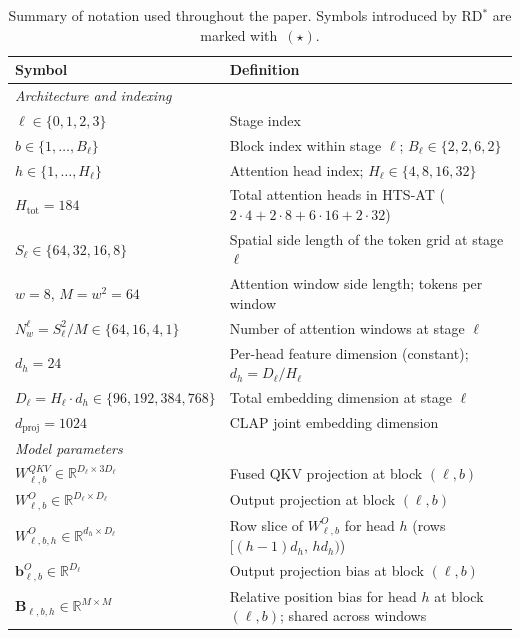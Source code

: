 \begin{table}[h]
\centering
\small
\setlength{\tabcolsep}{4pt}
\renewcommand{\arraystretch}{0.92}
\caption{Summary of notation used throughout the paper. 
    Symbols introduced by RD$^*$ are marked with~$(\star)$.}
\label{tab:notation}
\begin{tabularx}{\textwidth}{lX}
\toprule
\textbf{Symbol} & \textbf{Definition} \\
\midrule
\multicolumn{2}{l}{\textit{Architecture and indexing}} \\
\midrule
$\ell \in \{0,1,2,3\}$ & Stage index \\
$b \in \{1,\ldots,B_\ell\}$ & Block index within stage $\ell$; $B_\ell \in \{2,2,6,2\}$ \\
$h \in \{1,\ldots,H_\ell\}$ & Attention head index; $H_\ell \in \{4,8,16,32\}$ \\
$H_{\mathrm{tot}} = 184$ & Total attention heads in HTS-AT ($2\cdot4+2\cdot8+6\cdot16+2\cdot32$) \\
$S_\ell \in \{64,32,16,8\}$ & Spatial side length of the token grid at stage $\ell$ \\
$w = 8$, $M = w^2 = 64$ & Attention window side length; tokens per window \\
$N_w^\ell = S_\ell^2/M \in \{64,16,4,1\}$ & Number of attention windows at stage $\ell$ \\
$d_h = 24$ & Per-head feature dimension (constant); $d_h = D_\ell/H_\ell$ \\
$D_\ell = H_\ell \cdot d_h \in \{96,192,384,768\}$ & Total embedding dimension at stage $\ell$ \\
$d_{\mathrm{proj}} = 1024$ & CLAP joint embedding dimension \\
\midrule
\multicolumn{2}{l}{\textit{Model parameters}} \\
\midrule
$W^{QKV}_{\ell,b} \in \mathbb{R}^{D_\ell \times 3D_\ell}$ & Fused QKV projection at block $(\ell,b)$ \\
$W^O_{\ell,b} \in \mathbb{R}^{D_\ell \times D_\ell}$ & Output projection at block $(\ell,b)$ \\
$W^O_{\ell,b,h} \in \mathbb{R}^{d_h \times D_\ell}$ & Row slice of $W^O_{\ell,b}$ for head $h$ (rows $[(h-1)d_h,\,hd_h)$) \\
$\mathbf{b}^O_{\ell,b} \in \mathbb{R}^{D_\ell}$ & Output projection bias at block $(\ell,b)$ \\
$\mathbf{B}_{\ell,b,h} \in \mathbb{R}^{M \times M}$ & Relative position bias for head $h$ at block $(\ell,b)$; shared across windows \\

\end{tabularx}
\end{table}
